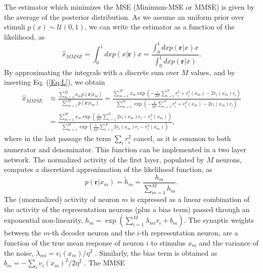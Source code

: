 \documentclass[a4paper]{article}%
\begin{document}
The estimator which minimizes the MSE (Minimum-MSE or MMSE) is given by the
average of the posterior distribution. As we assume an uniform prior over
stimuli $p(x) \sim\mathcal{U}(0,1)$, we can write the estimator as a function
of the likelihood, as
\begin{equation}
\hat{x}_{MMSE} = \int_{0}^{1} dx p(x| \mathbf{r}) x = \frac{\displaystyle\int%
_{0}^{1} dx p(\mathbf{r}|x)x}{\displaystyle\int_{0}^{1} dx p(\mathbf{r}|x)}.
\label{Eq:dec}%
\end{equation}
By approximating the integrals with a discrete sum over $M$ values, and by
inserting Eq. (\ref{Eq:L}), we obtain
\begin{equation}%
\begin{split}
\hat{x}_{MMSE}  &  \approx\frac{\sum_{m=1}^{M} x_{m} p\left(  \mathbf{r}%
|x_{m}\right)  }{\sum_{m=1}^{M} p\left(  \mathbf{r} |x_{m}\right)  } =
\frac{\sum_{m=1}^{M} x_{m} \exp{\left(  -\frac{1}{2\eta^{2}}\sum_{i=1}^{N}
r_{i}^{2} + v_{i}^{2} (x_{m}) - 2v_{i}(x_{m})r_{i} \right)  }}{\sum_{m=1}^{M}
\exp{\left(  -\frac{1}{2\eta^{2}} \sum_{i=1}^{N} r_{i}^{2} + v_{i}^{2}(x_{m})
- 2v_{i}(x_{m})r_{i} \right)  }}\\
&  = \frac{\sum_{m=1}^{M} x_{m} \exp{\left(  \frac{1}{2\eta^{2}}\sum_{i=1}^{N}
2v_{i}(x_{m})r_{i} -v_{i}^{2}(x_{m})\right)  }}{\sum_{m=1}^{M} \exp{\left(
\frac{1}{2\eta^{2}} \sum_{i=1}^{N} 2v_{i}(x_{m})r_{i}-v_{i}^{2}(x_{m})\right)
}},
\end{split}
\end{equation}
where in the last passage the term $\sum_{i} r_{i}^{2} $ cancel, as it is
common to both numerator and denominator. This function can be implemented in
a two layer network. The normalized activity of the first layer, populated by
$M$ neurons, computes a discretized approximation of the likelihood function,
as
\begin{equation}
p(\mathbf{r}|x_{m}) = \tilde{h}_{m} = \frac{h_{m}}{\sum_{m=1}^{M} h_{m}}.
\end{equation}
The (unormalized) activity of neuron $m$ is expressed as a linear combination
of the activity of the representation neurons (plus a bias term) passed
through an exponential non-linearity, $h_{m} = \exp{\left(  \sum_{i=1}^{M}
\lambda_{mi}r_{i} + b_{m}\right)  }$. The synaptic weights between the $m$-th
decoder neuron and the $i$-th representation neuron, are a function of the
true mean response of neuron $i$ to stimulus $x_{m}$ and the variance of the
noise, $\lambda_{mi} = v_{i}(x_{m})/\eta^{2}$ . Similarly, the bias term is
obtained as $b_{m} = -\sum_{i} v_{i}(x_{m})^{2}/2\eta^{2}$ . The MMSE
\end{document}
